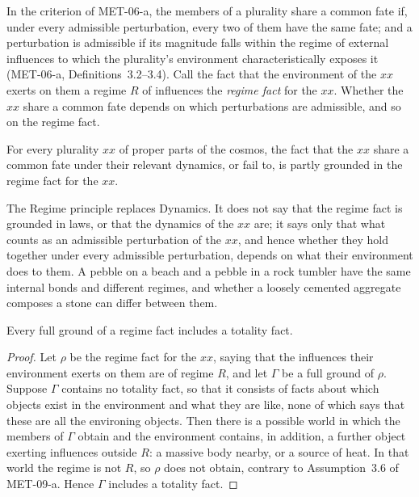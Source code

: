 \documentclass{situationist-preprint}
\begin{document}
In the criterion of MET-06-a, the members of a plurality share a common fate if, under every admissible perturbation, every two of them have the same fate; and a perturbation is admissible if its magnitude falls within the regime of external influences to which the plurality's environment characteristically exposes it (MET-06-a, Definitions~3.2--3.4). Call the fact that the environment of the $xx$ exerts on them a regime $R$ of influences the \emph{regime fact} for the $xx$. Whether the $xx$ share a common fate depends on which perturbations are admissible, and so on the regime fact.

\begin{principle}[Regime]\label{p:regime}
For every plurality $xx$ of proper parts of the cosmos, the fact that the $xx$ share a common fate under their relevant dynamics, or fail to, is partly grounded in the regime fact for the $xx$.
\end{principle}

The Regime principle replaces Dynamics. It does not say that the regime fact is grounded in laws, or that the dynamics of the $xx$ are; it says only that what counts as an admissible perturbation of the $xx$, and hence whether they hold together under every admissible perturbation, depends on what their environment does to them. A pebble on a beach and a pebble in a rock tumbler have the same internal bonds and different regimes, and whether a loosely cemented aggregate composes a stone can differ between them.

\begin{lemma}\label{l:regime}
Every full ground of a regime fact includes a totality fact.
\end{lemma}

\begin{proof}
Let $\rho$ be the regime fact for the $xx$, saying that the influences their environment exerts on them are of regime $R$, and let $\Gamma$ be a full ground of $\rho$. Suppose $\Gamma$ contains no totality fact, so that it consists of facts about which objects exist in the environment and what they are like, none of which says that these are all the environing objects. Then there is a possible world in which the members of $\Gamma$ obtain and the environment contains, in addition, a further object exerting influences outside $R$: a massive body nearby, or a source of heat. In that world the regime is not $R$, so $\rho$ does not obtain, contrary to Assumption~3.6 of MET-09-a. Hence $\Gamma$ includes a totality fact.
\end{proof}
\end{document}

